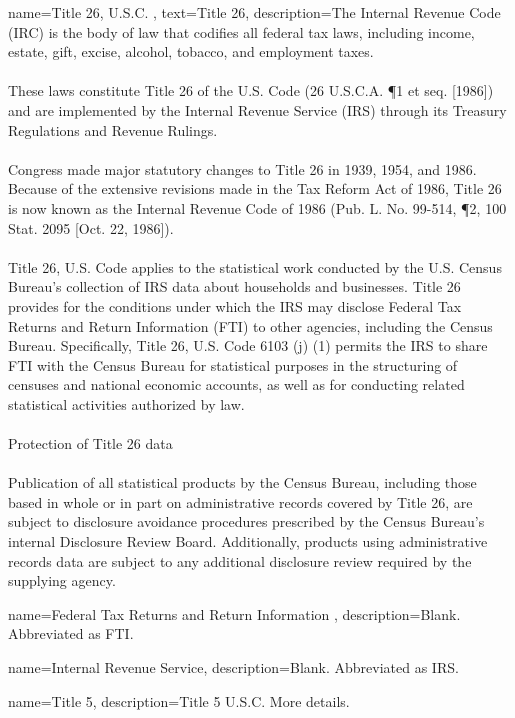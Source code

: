 {
name={Title 26, U.S.C.} ,
text={Title 26},
description={The Internal Revenue Code (IRC) is the body of law that codifies all federal tax laws, including income, estate, gift, excise, alcohol, tobacco, and employment taxes. \\
\\
These laws constitute Title 26 of the U.S. Code (26 U.S.C.A. \P 1 et seq. [1986]) and are implemented by the Internal Revenue Service (\gls{IRS}) through its Treasury Regulations and Revenue Rulings.\\
\\
Congress made major statutory changes to Title 26 in 1939, 1954, and 1986. Because of the extensive revisions made in the Tax Reform Act of 1986, Title 26 is now known as the Internal Revenue Code of 1986 (Pub. L. No. 99-514, \P 2, 100 Stat. 2095 [Oct. 22, 1986]).\\
\\
Title 26, U.S. Code applies to the statistical work conducted by the U.S. Census Bureau's collection of IRS data about households and businesses. Title 26 provides for the conditions under which the IRS may disclose Federal Tax Returns and Return Information (\gls{FTI}) to other agencies, including the Census Bureau. Specifically, Title 26, U.S. Code 6103 (j) (1) permits the IRS to share FTI with the Census Bureau for statistical purposes in the structuring of censuses and national economic accounts, as well as for conducting related statistical activities authorized by law.\\
\\
Protection of Title 26 data\\
\\
Publication of all statistical products by the Census Bureau, including those based in whole or in part on administrative records covered by Title 26, are subject to disclosure avoidance procedures prescribed by the Census Bureau's internal Disclosure Review Board. Additionally, products using administrative records data are subject to any additional disclosure review required by the supplying agency. \parencite{us_census_bureau_title_nodate}}
}

{
name={Federal Tax Returns and Return Information },
description={Blank. Abbreviated as FTI.}
}

{
name={Internal Revenue Service},
description={Blank. Abbreviated as IRS.}
}

{
name=Title 5,
description={Title 5 U.S.C. More details.}
}


